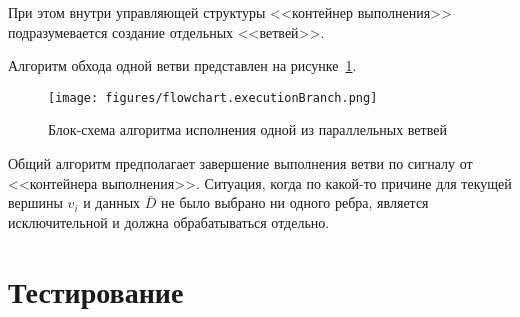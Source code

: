 При этом внутри управляющей структуры <<контейнер выполнения>> подразумевается создание отдельных <<ветвей>>.

Алгоритм обхода одной ветви представлен на рисунке~\ref{fig:flowchartExecutionBranch}.

\begin{figure}[H]
    \centering
    \texttt{[image: figures/flowchart.executionBranch.png]}
    \caption{Блок-схема алгоритма исполнения одной из параллельных ветвей}
    \label{fig:flowchartExecutionBranch}
\end{figure}

Общий алгоритм предполагает завершение выполнения ветви по сигналу от <<контейнера выполнения>>. Ситуация, когда по какой-то причине для текущей вершины $v_i$ и данных $\bar{D}$ не было выбрано ни одного ребра, является исключительной и должна обрабатываться отдельно.

\section{Тестирование}

